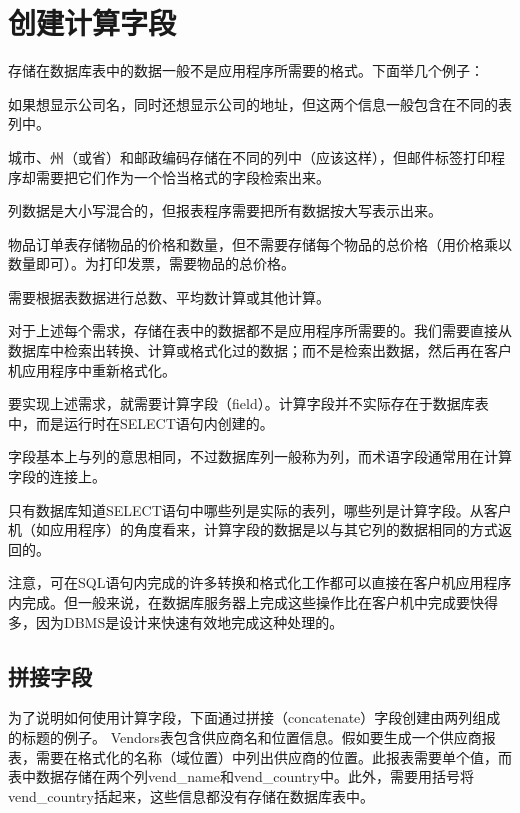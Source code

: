\section{创建计算字段}

存储在数据库表中的数据一般不是应用程序所需要的格式。下面举几个例子：


\begin{compactitem}
\item 如果想显示公司名，同时还想显示公司的地址，但这两个信息一般包含在不同的表列中。
\item 城市、州（或省）和邮政编码存储在不同的列中（应该这样），但邮件标签打印程序却需要把它们作为一个恰当格式的字段检索出来。
\item 列数据是大小写混合的，但报表程序需要把所有数据按大写表示出来。
\item 物品订单表存储物品的价格和数量，但不需要存储每个物品的总价格（用价格乘以数量即可）。为打印发票，需要物品的总价格。
\item 需要根据表数据进行总数、平均数计算或其他计算。
\end{compactitem}

对于上述每个需求，存储在表中的数据都不是应用程序所需要的。我们需要直接从数据库中检索出转换、计算或格式化过的数据；而不是检索出数据，然后再在客户机应用程序中重新格式化。

要实现上述需求，就需要计算字段（field）。计算字段并不实际存在于数据库表中，而是运行时在SELECT语句内创建的。

字段基本上与列的意思相同，不过数据库列一般称为列，而术语字段通常用在计算字段的连接上。

只有数据库知道SELECT语句中哪些列是实际的表列，哪些列是计算字段。从客户机（如应用程序）的角度看来，计算字段的数据是以与其它列的数据相同的方式返回的。

注意，可在SQL语句内完成的许多转换和格式化工作都可以直接在客户机应用程序内完成。但一般来说，在数据库服务器上完成这些操作比在客户机中完成要快得多，因为DBMS是设计来快速有效地完成这种处理的。
\subsection{拼接字段}


为了说明如何使用计算字段，下面通过拼接（concatenate）字段创建由两列组成的标题的例子。
Vendors表包含供应商名和位置信息。假如要生成一个供应商报表，需要在格式化的名称（域位置）中列出供应商的位置。此报表需要单个值，而表中数据存储在两个列vend\_name和vend\_country中。此外，需要用括号将vend\_country括起来，这些信息都没有存储在数据库表中。

